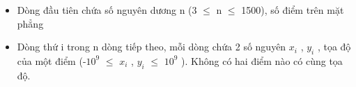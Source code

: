 \begin{itemize}
	\item     Dòng đầu tiên chứa số nguyên dương n (3 $\le$ n $\le$ 1500), số điểm trên mặt phẳng   
	\item     Dòng thứ i trong n dòng tiếp theo, mỗi dòng chứa 2 số nguyên $x_{i}$    , $y_{i}$    , tọa độ của một điểm (-$10^{9}$     $\le$ $x_{i}$    , $y_{i}$     $\le$  $10^{9}$    ). Không có hai điểm nào có cùng tọa độ.   
\end{itemize}